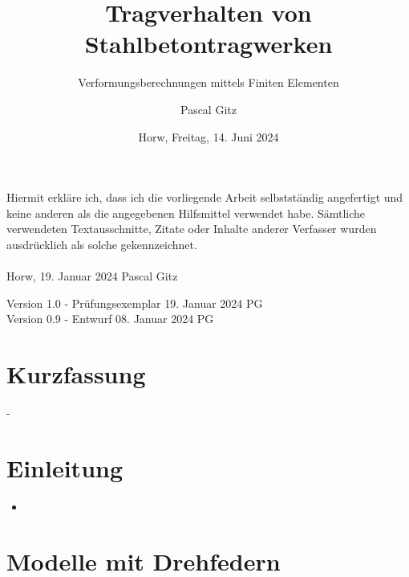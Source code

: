 \documentclass[
  12pt,
  letterpaper,
  egregdoesnotlikesansseriftitles]{scrreprt}
\title{Tragverhalten von Stahlbetontragwerken}
\subtitle
{Verformungsberechnungen mittels Finiten Elementen}
\date{\large Horw, Freitag, 14. Juni 2024}
\author{Pascal Gitz}
\providecommand{\tightlist}{%
  \setlength{\itemsep}{0pt}\setlength{\parskip}{0pt}}\usepackage{longtable,booktabs,array}
\renewcommand*\contentsname{Inhaltsverzeichnis}
\newcommand\contentsname{Inhaltsverzeichnis}
\begin{document}
\maketitle


Hiermit erkläre ich, dass ich die vorliegende Arbeit selbstständig angefertigt und keine anderen als die angegebenen Hilfsmittel verwendet habe. Sämtliche verwendeten Textausschnitte, Zitate oder Inhalte anderer Verfasser wurden ausdrücklich als solche gekennzeichnet.\\%
%
\\%
%
Horw, 19. Januar 2024 \hfill Pascal Gitz%

\vfill

Version 1.0 - Prüfungsexemplar \hfill 19. Januar 2024 \quad \quad \quad \quad \quad PG\\
Version 0.9 - Entwurf \hfill 08. Januar 2024 \quad \quad \quad \quad \quad PG\\

\newpage

\chapter*{Kurzfassung}

-

\renewcommand*\contentsname{Inhaltsverzeichnis}
{
\hypersetup{linkcolor=}
\setcounter{tocdepth}{1}
\tableofcontents
}
\listoffigures
\listoftables
{}

\chapter{Einleitung}\label{einleitung}

\begin{itemize}
\tightlist
\item
\end{itemize}


\chapter{Modelle mit Drehfedern}\label{modelle-mit-drehfedern}
\end{document}
